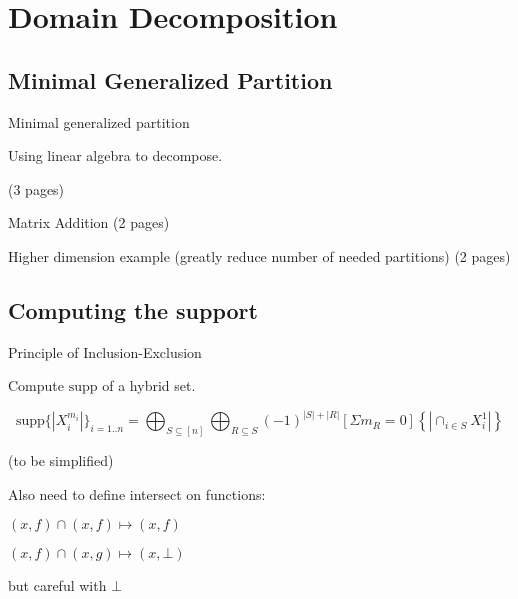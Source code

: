 \chapter{Domain Decomposition}
\doublespacing
\section{Minimal Generalized Partition}

\begin{definition}
Minimal generalized partition
\end{definition}

Using linear algebra to decompose.

(3 pages)

\begin{example}{Matrix Addition} (2 pages)
\end{example}

\begin{example}{Higher dimension example} (greatly reduce number of needed partitions) (2 pages)
\end{example}

\newpage \addtocounter{page}{6}

\section{Computing the support}

\begin{definition}
Principle of Inclusion-Exclusion
\end{definition}

Compute $\mathrm{supp}$ of a hybrid set. 

\begin{equation}
\mathrm{supp}\{\!| X_i ^{m_i} |\!\}_{i=1..n} = \bigoplus_{S \subseteq [n]} \bigoplus_{R \subseteq S} (-1)^{|S|+|R|} [\Sigma m_R = 0] \left\{\!\left| \cap_{i \in S} X_i^1 \right|\!\right\}
\end{equation}

(to be simplified)

Also need to define intersect on functions: 

$(x,f) \cap (x,f) \mapsto (x,f)$

$(x,f) \cap (x,g) \mapsto (x,\bot)$

but careful with $\bot$


